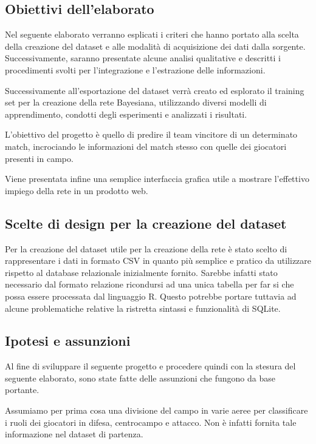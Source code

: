 \documentclass[hidelinks, 12pt]{article}
\begin{document}
	
	
	\subsection{Obiettivi dell'elaborato}
	
	Nel seguente elaborato verranno esplicati i criteri che hanno portato alla scelta della creazione del dataset e alle modalità di acquisizione dei dati dalla sorgente. Successivamente, saranno presentate alcune analisi qualitative e descritti i procedimenti svolti per l'integrazione e l'estrazione delle informazioni.
	
	Successivamente all'esportazione del dataset verrà creato ed esplorato il training set per la creazione della rete Bayesiana, utilizzando diversi modelli di apprendimento, condotti degli esperimenti e analizzati i risultati.
	
	L'obiettivo del progetto è quello di predire il team vincitore di un determinato match, incrociando le informazioni del match stesso con quelle dei giocatori presenti in campo.
	
	Viene presentata infine una semplice interfaccia grafica utile a mostrare l'effettivo impiego della rete in un prodotto web.
	
	
	\subsection{Scelte di design per la creazione del dataset}
	
	Per la creazione del dataset utile per la creazione della rete è stato scelto di rappresentare i dati in formato CSV in quanto più semplice e pratico da utilizzare rispetto al database relazionale inizialmente fornito. Sarebbe infatti stato necessario dal formato relazione ricondursi ad una unica tabella per far si che possa essere processata dal linguaggio R. Questo potrebbe portare tuttavia ad alcune problematiche relative la ristretta sintassi e funzionalità di SQLite.
	
	
	
	\subsection{Ipotesi e assunzioni}
	
	Al fine di sviluppare il seguente progetto e procedere quindi con la stesura del seguente elaborato, sono state fatte delle assunzioni che fungono da base portante.
	
	Assumiamo per prima cosa una divisione del campo in varie aeree per classificare i ruoli dei giocatori in difesa, centrocampo e attacco. Non è infatti fornita tale informazione nel dataset di partenza.
	
\end{document}
